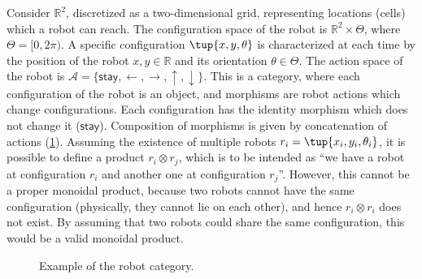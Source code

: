 \begin{example}
\label{ex:robot}
Consider $\mathbb{R}^2$, discretized as a two-dimensional grid, representing locations (cells) which a robot can reach. The configuration space of the robot is $\mathbb{R}^2\times \Theta$, where $\Theta=[0,2\pi)$. A specific configuration $\tup{x,y,\theta}$ is characterized at each time by the position of the robot $x,y\in \mathbb{R}$ and its orientation $\theta \in \Theta$. The action space of the robot is $\mathcal{A}=\{\mathsf{stay},\leftarrow, \rightarrow, \uparrow, \downarrow\}$. This is a category, where each configuration of the robot is an object, and morphisms are robot actions which change configurations. Each configuration has the identity morphism which does not change it ($\mathsf{stay}$). Composition of morphisms is given by concatenation of actions (\cref{fig:robotcategory}). Assuming the existence of multiple robots $r_i=\tup{x_i,y_i,\theta_i}$, it is possible to define a product $r_i\otimes r_j$, which is to be intended as ``we have a robot at configuration $r_i$ and another one at configuration $r_j$''. However, this cannot be a proper monoidal product, because two robots cannot have the same configuration (physically, they cannot lie on each other), and hence $r_i\otimes r_i$ does not exist. By assuming that two robots could share the same configuration, this would be a valid monoidal product.
\begin{figure}[tbh]
\begin{center}
\end{center}
\caption{Example of the robot category. \label{fig:robotcategory}}
\end{figure}
\end{example}

